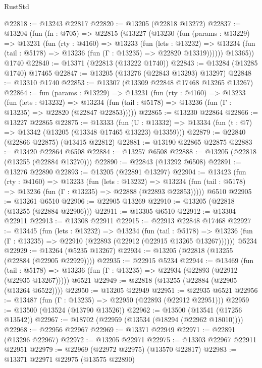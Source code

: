 \begin{lexlean}{RustStd}
\begin{coremodule}
@22818 := @13243 @22817
@22820 := @13205 (@22818 @13272)
@22837 := @13204
    (fun (fn : @705) =>
    @22815
      (@13227
        (@13230
          (fun (params : @13229) =>
          @13231
            (fun (rty : @4160) =>
            @13233
              (fun (lets : @13232) =>
              @13234 (fun (tail : @5178) => @13236 (fun (Γ : @13235) => @22820 @13319))))))
        @13365))
    @1740
@22840 := @13371 (@22813 (@13222 @1740))
@22843 := @13284 (@13285 @1740) @17465
@22847 := @13205 (@13276 (@22843 @13293) @13297)
@22848 := @13310 @1740
@22853 := @13307 (@13309 @22848 @17468 @13265 @13267)
@22864 := fun (params : @13229) =>
  @13231
    (fun (rty : @4160) =>
    @13233
      (fun (lets : @13232) =>
      @13234 (fun (tail : @5178) => @13236 (fun (Γ : @13235) => @22820 (@22847 @22853)))))
@22865 := @13230 @22864
@22866 := @13227 @22865
@22875 := @13333
    (fun (U : @13332) => @13334 (fun (t : @7) => @13342 (@13205 (@13348 @17465 @13223) @13359)))
@22879 := @22840 (@22866 @22875) (@13415 @22812)
@22881 := @13190 @22865 @22875
@22883 := @13420 @22864 @6508
@22884 := @13257 @6508
@22888 := @13205 (@22818 (@13255 (@22884 @13270)))
@22890 := @22843 (@13292 @6508)
@22891 := @13276 @22890
@22893 := @13205 (@22891 @13297)
@22904 := @13423
    (fun (rty : @4160) =>
    @13233
      (fun (lets : @13232) =>
      @13234 (fun (tail : @5178) => @13236 (fun (Γ : @13235) => @22888 (@22893 @22853)))))
    @6510
@22905 := @13261 @6510
@22906 := @22905 @13269
@22910 := @13205 (@22818 (@13255 (@22884 @22906)))
@22911 := @13305 @6510
@22912 := @13304 @22911
@22913 := @13308 @22911
@22915 := @22913 @22848 @17468
@22927 := @13445
    (fun (lets : @13232) =>
    @13234
      (fun (tail : @5178) =>
      @13236 (fun (Γ : @13235) => @22910 (@22893 (@22912 (@22915 @13265 @13267))))))
    @5234
@22929 := @13264 (@5235 @13267)
@22934 := @13205 (@22818 (@13255 (@22884 (@22905 @22929))))
@22935 := @22915 @5234
@22944 := @13469
    (fun (tail : @5178) => @13236 (fun (Γ : @13235) => @22934 (@22893 (@22912 (@22935 @13267)))))
    @6521
@22949 := @22818 (@13255 (@22884 (@22905 (@13264 @6522))))
@22950 := @13205 @22949
@22951 := @22935 @6521
@22956 := @13487 (fun (Γ : @13235) => @22950 (@22893 (@22912 @22951)))
@22959 := @13500 (@13524 (@13790 @13526))
@22962 := @13500 (@13541 (@17256 @13542))
@22967 := @18702 (@22959 (@13534 (@18294 (@22962 @18010))))
@22968 := @22956 @22967
@22969 := @13371 @22949
@22971 := @22891 (@13296 @22967)
@22972 := @13205 @22971
@22975 := @13303 @22967 @22911 @22951
@22979 := @22969 (@22972 @22975) (@13570 @22817)
@22983 := @13371 @22971 @22975 (@13575 @22890)

\end{coremodule}
\end{lexlean}
